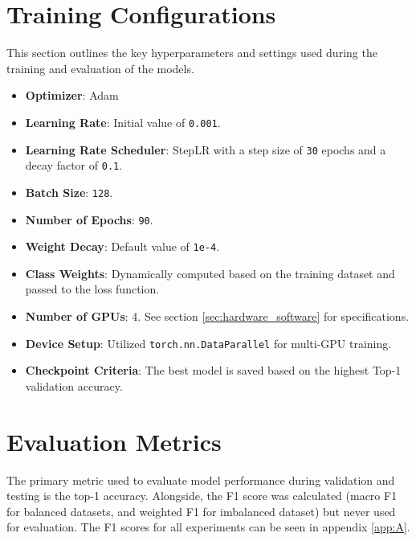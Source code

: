 \section{Training Configurations}
This section outlines the key hyperparameters and settings used during the training and evaluation of the models.

\begin{itemize}
    \item \textbf{Optimizer}: Adam
    \item \textbf{Learning Rate}: Initial value of \texttt{0.001}.
    \item \textbf{Learning Rate Scheduler}: StepLR with a step size of \texttt{30} epochs and a decay factor of \texttt{0.1}.
    \item \textbf{Batch Size}: \texttt{128}.
    \item \textbf{Number of Epochs}: \texttt{90}.
    \item \textbf{Weight Decay}: Default value of \texttt{1e-4}.
    \item \textbf{Class Weights}: Dynamically computed based on the training dataset and passed to the loss function. 
    \item \textbf{Number of GPUs}: 4. See section \ref{sec:hardware_software} for specifications.
    \item \textbf{Device Setup}: Utilized \texttt{torch.nn.DataParallel} for multi-GPU training.
    \item \textbf{Checkpoint Criteria}: The best model is saved based on the highest Top-1 validation accuracy.
\end{itemize}


\section{Evaluation Metrics}
The primary metric used to evaluate model performance during validation and testing is the top-1 accuracy. Alongside, the F1 score was calculated (macro F1 for balanced datasets, and weighted F1 for imbalanced dataset) but never used for evaluation. The F1 scores for all experiments can be seen in appendix \ref{app:A}.

